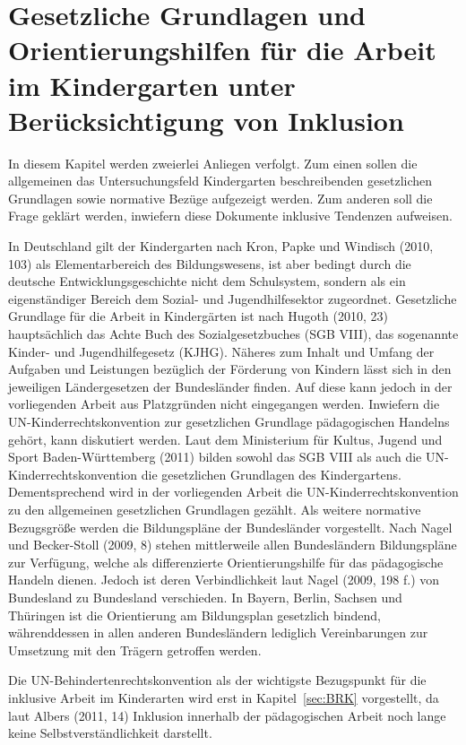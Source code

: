 \section{Gesetzliche Grundlagen und Orientierungshilfen für die Arbeit im Kindergarten unter Berücksichtigung von Inklusion}

In diesem Kapitel werden zweierlei Anliegen verfolgt. Zum einen sollen die allgemeinen das Untersuchungsfeld Kindergarten beschreibenden gesetzlichen Grundlagen sowie normative Bezüge aufgezeigt werden. Zum anderen soll die Frage geklärt werden, inwiefern diese Dokumente inklusive Tendenzen aufweisen. 

In Deutschland gilt der Kindergarten nach Kron, Papke und Windisch (2010, 103) als Elementarbereich des Bildungswesens, ist aber bedingt durch die deutsche Entwicklungsgeschichte nicht dem Schulsystem, sondern als ein eigenständiger Bereich dem Sozial- und Jugendhilfesektor zugeordnet. 
Gesetzliche Grundlage für die Arbeit in Kindergärten ist nach Hugoth (2010, 23) hauptsächlich das Achte Buch des Sozialgesetzbuches (SGB VIII), das sogenannte Kinder- und Jugendhilfegesetz (KJHG). Näheres zum Inhalt und Umfang der Aufgaben und Leistungen bezüglich der Förderung von Kindern lässt sich in den jeweiligen Ländergesetzen der Bundesländer finden. Auf diese kann jedoch in der vorliegenden Arbeit aus Platzgründen nicht eingegangen werden. 
Inwiefern die UN-Kinderrechtskonvention zur gesetzlichen Grundlage pädagogischen Handelns gehört, kann diskutiert werden. Laut dem Ministerium für Kultus, Jugend und Sport Baden-Württemberg (2011) bilden sowohl das SGB VIII als auch die UN-Kinderrechtskonvention die gesetzlichen Grundlagen des Kindergartens. Dementsprechend wird in der vorliegenden Arbeit die UN-Kinderrechtskonvention zu den allgemeinen gesetzlichen Grundlagen gezählt. 
Als weitere normative Bezugsgröße werden die Bildungspläne der Bundesländer vorgestellt. Nach Nagel und Becker-Stoll (2009, 8) stehen  mittlerweile allen Bundesländern Bildungspläne zur Verfügung, welche als differenzierte Orientierungshilfe für das pädagogische Handeln dienen. Jedoch ist deren Verbindlichkeit laut Nagel (2009, 198 f.) von Bundesland zu Bundesland verschieden. In Bayern, Berlin, Sachsen und Thüringen ist die Orientierung am Bildungsplan gesetzlich bindend, währenddessen in allen anderen Bundesländern lediglich Vereinbarungen zur Umsetzung mit den Trägern getroffen werden.
 
Die UN-Behindertenrechtskonvention als der wichtigste Bezugspunkt für die inklusive Arbeit im Kinderarten wird erst in Kapitel~\ref{sec:BRK} vorgestellt, da laut Albers (2011, 14) Inklusion innerhalb der pädagogischen Arbeit noch lange keine Selbstverständlichkeit darstellt.  

